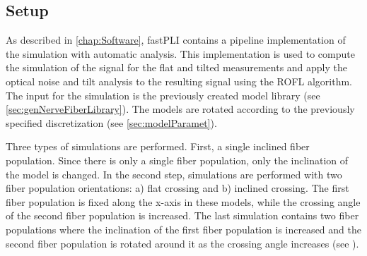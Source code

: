 \subsection{Setup}
\label{sec:simParameterEnv}
% 
%
As described in \cref{chap:Software}, \ac{fastPLI} contains a pipeline implementation of the simulation with automatic analysis.
This implementation is used to compute the simulation of the signal for the flat and tilted measurements and apply the optical noise and tilt analysis to the resulting signal using the \ac{ROFL} algorithm. 
The input for the simulation is the previously created model library (see \cref{sec:genNerveFiberLibrary}).
The models are rotated according to the previously specified discretization (see \cref{sec:modelParamet}).
\par
% 
Three types of simulations are performed. First, a single inclined fiber population.
Since there is only a single fiber population, only the inclination of the model is changed.
In the second step, simulations are performed with two fiber population orientations: a) flat crossing and b) inclined crossing.
The first fiber population is fixed along the x-axis in these models, while the crossing angle of the second fiber population is increased.
The last simulation contains two fiber populations where the inclination of the first fiber population is increased and the second fiber population is rotated around it as the crossing angle increases (see \dummy{}).
\par
% 
